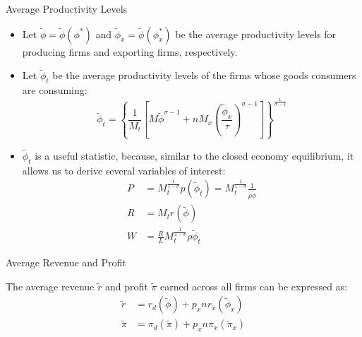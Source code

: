 \documentclass[aspectratio=169]{beamer}
\begin{document}
\begin{frame}{Average Productivity Levels}

{\small
\begin{itemize}
    \item<1-> Let $ \tilde{\phi} = \tilde{\phi}\left( \phi^{*} \right) $ and $ \tilde{\phi}_{x} = \tilde{\phi}\left( \phi_{x}^{*} \right) $ be the average productivity levels for producing firms and exporting firms, respectively.
    \item<2-> Let $ \tilde{\phi}_{t} $ be the average productivity levels of the firms whose goods consumers are consuming:
    \begin{equation*}
        \tilde{\phi}_{t} = \left\{ \frac{1}{M_{t}} \left[ M \tilde{\phi}^{\sigma - 1} + nM_{x}\left( \frac{\tilde{\phi}_{x}}{\tau} \right)^{\sigma - 1} \right] \right\}^{\frac{1}{\sigma - 1}}
    \end{equation*}
    \item<3-> $ \tilde{\phi}_{t} $ is a useful statistic, because, similar to the closed economy equilibrium, it allows us to derive several variables of interest:
    \begin{equation*}
        \begin{split}
            P &= M_{t}^{\frac{1}{1 - \sigma}} p\left( \tilde{\phi}_{t} \right) = M_{t}^{\frac{1}{1 - \sigma}} \frac{1}{\rho \tilde{\phi}} \\
            R &= M_{t} r\left( \tilde{\phi} \right) \\
            W &= \frac{R}{L} M_{t}^{\frac{1}{1 - \sigma}} \rho \tilde{\phi}_{t}
        \end{split}
    \end{equation*}
\end{itemize}
}
    
\end{frame}


\begin{frame}{Average Revenue and Profit}

The average revenue $ \tilde{r} $ and profit $ \tilde{\pi} $ earned across all firms can be expressed as:
\begin{equation*}
    \begin{split}
        \tilde{r} &= r_{d}\left( \tilde{\phi} \right) + p_{x} n r_{x}\left( \tilde{\phi}_{x} \right) \\
        \tilde{\pi} &= \pi_{d}\left( \tilde{\pi} \right) + p_{x} n \pi_{x}\left( \tilde{\pi}_{x} \right)
    \end{split}
\end{equation*}
    
\end{frame}
\end{document}
